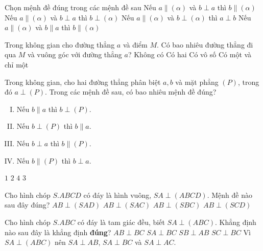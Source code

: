 \begin{ex}%
	Chọn mệnh đề đúng trong các mệnh đề sau
	\choice
	{Nếu $a \parallel (\alpha)$ và $b \perp a$ thì $b \parallel (\alpha)$}
	{Nếu $a \parallel (\alpha)$ và $b \perp a$ thì $b \perp (\alpha)$}
	{\True Nếu $a \parallel (\alpha)$ và $b \perp (\alpha)$ thì $a \perp b$}
	{Nếu $a \parallel (\alpha)$ và $b \parallel a$ thì $b \parallel (\alpha)$}
\end{ex}
\begin{ex}%
	Trong không gian cho đường thẳng $a$ và điểm $M$. Có bao nhiêu đường thẳng đi qua $M$ và vuông góc với đường thẳng $a$?
	\choice
	{Không có}
	{Có hai}
	{\True Có vô số}
	{Có một và chỉ một}
\end{ex}
\begin{ex}%
	Trong không gian, cho hai đường thẳng phân biệt $a,b$ và mặt phẳng $(P)$, trong đó $a\perp (P)$. Trong các mệnh đề sau, có bao nhiêu mệnh đề đúng?
	\begin{multicols}{2}
	\begin{enumerate}[(I)]
	\item Nếu $b\parallel a$ thì $b\perp (P)$.
	\item Nếu $b\perp (P)$ thì $b\parallel a$.
	\item Nếu $b\perp a$ thì $b\parallel (P)$.
	\item Nếu $b\parallel (P)$ thì $b\perp a$.
	\end{enumerate}
	\end{multicols}
	\choice
	{$1$}
	{$ 2$}
	{$4 $}
	{\True $ 3$}
\end{ex}
\begin{ex}%
	Cho hình chóp $S.ABCD$ có đáy là hình vuông, $SA\perp (ABCD)$. Mệnh đề nào sau đây đúng? 
	\choice
	{\True $AB\perp (SAD)$}
	{$AB\perp (SAC)$}
	{$AB\perp (SBC)$}
	{$AB\perp (SCD)$}
\end{ex}
\begin{ex}%
	Cho hình chóp $S.ABC$ có đáy là tam giác đều, biết $SA\perp (ABC)$. Khẳng định nào sau đây là khẳng định \textbf{đúng}?
	\choice
	{$AB\perp BC$}
	{\True $SA\perp BC$}
	{$SB\perp AB$}
	{$SC\perp BC$}
	\loigiai
	{Vì $SA\perp (ABC)$ nên $SA\perp AB$, $SA\perp BC$ và $SA\perp AC$.}
\end{ex}
